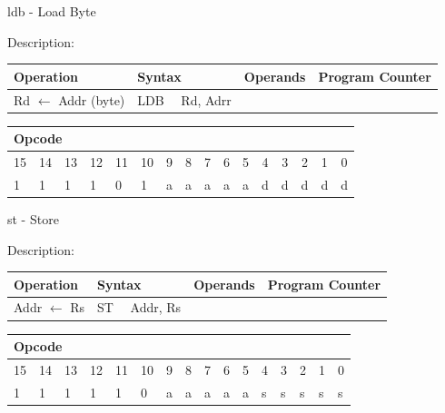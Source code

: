 \documentclass[%
	pdftex,
	a4paper,
	oneside,
	bibtotoc,%
	idxtotoc,%
	bibtotocnumbered,
	halfparskip,%
]{scrbook}
\begin{document}
\bigskip

ldb - Load Byte

Description:

\begin{tabular}{|l|l|l|l|}
\hline
Operation & Syntax & Operands & Program Counter \\ \hline
Rd $\leftarrow $ Addr (byte) & LDB \ \ Rd, Adrr &  &  \\ \hline
\end{tabular}

\begin{tabular}{|c|c|c|c|c|c|c|c|c|c|c|c|c|c|c|c|}
\hline
\multicolumn{6}{|l|}{Opcode} & \multicolumn{5}{|l|}{} & \multicolumn{5}{|l|}{
} \\ \hline
15 & 14 & 13 & 12 & 11 & 10 & 9 & 8 & 7 & 6 & 5 & 4 & 3 & 2 & 1 & 0 \\ \hline
\multicolumn{1}{|l|}{1} & \multicolumn{1}{|l|}{1} & \multicolumn{1}{|l|}{1}
& \multicolumn{1}{|l|}{1} & \multicolumn{1}{|l|}{0} & \multicolumn{1}{|l|}{1}
& \multicolumn{1}{|l|}{a} & \multicolumn{1}{|l|}{a} & \multicolumn{1}{|l|}{a}
& \multicolumn{1}{|l|}{a} & \multicolumn{1}{|l|}{a} & \multicolumn{1}{|l|}{d}
& \multicolumn{1}{|l|}{d} & \multicolumn{1}{|l|}{d} & \multicolumn{1}{|l|}{d}
& \multicolumn{1}{|l|}{d} \\ \hline
\end{tabular}

\bigskip

st - Store

Description:

\begin{tabular}{|l|l|l|l|}
\hline
Operation & Syntax & Operands & Program Counter \\ \hline
Addr $\leftarrow $ Rs & ST \ \ Addr, Rs &  &  \\ \hline
\end{tabular}

\begin{tabular}{|c|c|c|c|c|c|c|c|c|c|c|c|c|c|c|c|}
\hline
\multicolumn{6}{|l|}{Opcode} & \multicolumn{5}{|l|}{} & \multicolumn{5}{|l|}{
} \\ \hline
15 & 14 & 13 & 12 & 11 & 10 & 9 & 8 & 7 & 6 & 5 & 4 & 3 & 2 & 1 & 0 \\ \hline
\multicolumn{1}{|l|}{1} & \multicolumn{1}{|l|}{1} & \multicolumn{1}{|l|}{1}
& \multicolumn{1}{|l|}{1} & \multicolumn{1}{|l|}{1} & \multicolumn{1}{|l|}{0}
& \multicolumn{1}{|l|}{a} & \multicolumn{1}{|l|}{a} & \multicolumn{1}{|l|}{a}
& \multicolumn{1}{|l|}{a} & \multicolumn{1}{|l|}{a} & \multicolumn{1}{|l|}{s}
& \multicolumn{1}{|l|}{s} & \multicolumn{1}{|l|}{s} & \multicolumn{1}{|l|}{s}
& \multicolumn{1}{|l|}{s} \\ \hline
\end{tabular}
\end{document}
